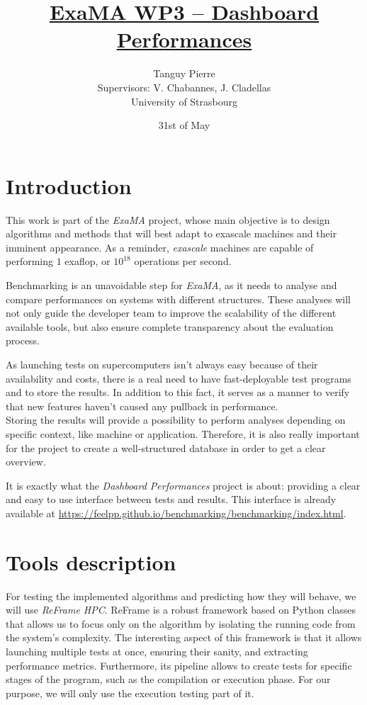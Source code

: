 \documentclass[12pt]{article}
\title{\underline{\textbf{ExaMA WP3 -- Dashboard Performances}}}
\author{Tanguy Pierre\\
            [1cm]
            Supervisors: V. Chabannes, J. Cladellas\\
            [2cm]
            University of Strasbourg}
\date{31st of May}
\begin{document}
    \maketitle      %

\newpage
\tableofcontents

\newpage
\section{Introduction}

This work is part of the \textit{ExaMA} project, whose main objective is to design algorithms and methods
that will best adapt to exascale machines and their imminent appearance.
As a reminder, \textit{exascale} machines are capable of performing $1$ exaflop, or $10^{18}$ operations per second.

Benchmarking is an unavoidable step for \textit{ExaMA}, as it needs to analyse and compare performances on systems
with different structures. These analyses will not only guide the developer team to improve the scalability of the different available tools,
but also ensure complete transparency about the evaluation process.

As launching tests on supercomputers isn't always easy because of their availability and costs, there is a real need to have fast-deployable test programs and to store the results.
In addition to this fact, it serves as a manner to verify that new features haven't caused any pullback in performance. \\
Storing the results will provide a possibility to perform analyses depending on specific context, like machine or application.
Therefore, it is also really important for the project to create a well-structured database in order to get a clear overview.

It is exactly what the \textit{Dashboard Performances} project is about: providing a clear and easy to use interface between tests and results.
This interface is already available at \url{https://feelpp.github.io/benchmarking/benchmarking/index.html}.


\section{Tools description}

For testing the implemented algorithms and predicting how they will behave, we will use \textit{ReFrame HPC}\cite*{ReFrame}.
ReFrame is a robust framework based on Python classes that allows us to focus only on the algorithm by isolating the running code from the system's complexity.
The interesting aspect of this framework is that it allows launching multiple tests at once, ensuring their sanity, and extracting performance metrics.
Furthermore, its pipeline allows to create tests for specific stages of the program, such as the compilation or execution phase. 
For our purpose, we will only use the execution testing part of it.
\end{document}
